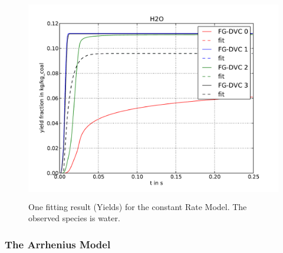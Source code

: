 \begin{figure}
\centering%
\includegraphics[height=9cm,angle=0]{Figures/FG-DVC-Fit_result_cR_H2O_Y}
\caption{One fitting result (Yields) for the constant Rate Model. The observed species is water.}
\label{F_Fit_cR_Y}
\end{figure}


\subsubsection{The Arrhenius Model}\label{SSS_Arrh}

